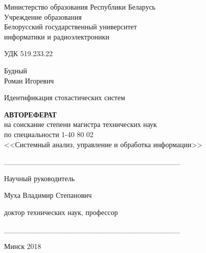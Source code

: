 \setlength{\parindent}{0mm} %
{\centering
  Министерство образования Республики Беларусь \\
  Учреждение образования \\
  Белорусский государственный университет \\
  информатики и радиоэлектроники \\
}

\vspace{2\baselineskip}
УДК 519.233.22

\vspace{\baselineskip}
{\centering
  Будный \\ Роман Игоревич

  \vspace{5\baselineskip}
  Идентификация стохастических систем

  \bigskip
  \textbf{АВТОРЕФЕРАТ} \\
  на соискание степени магистра технических наук \\
  по специальности 1-40 80 02 \\
  <<Системный анализ, управление и обработка информации>> \\
}

\vspace{2\baselineskip}
\begin{minipage}{.45\linewidth}
\end{minipage}
\hfill
\begin{minipage}{.5\linewidth}
  \_\_\_\_\_\_\_\_\_\_\_\_\_\_\_\_\_\_\_\_\_\_\_\_\_\_\_\_\_\_\_\_\_

  \vspace{1.5\baselineskip}
  Научный руководитель

  \smallskip
  Муха Владимир Степанович

  \smallskip
  доктор технических наук, профессор

  \bigskip
  \_\_\_\_\_\_\_\_\_\_\_\_\_\_\_\_\_\_\_\_\_\_\_\_\_\_\_\_\_\_\_\_\_
\end{minipage}

\vfill
{\centering Минск 2018 \\}
\thispagestyle{empty}
\pagebreak
\setlength{\parindent}{1.25cm} %